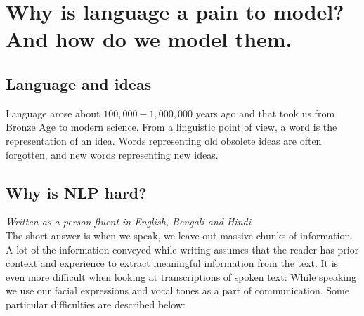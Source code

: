 
\chapter{Why is language a pain to model? And how do we model them.}
\section{Language and ideas}
Language arose about $100,000-1,000,000$ years ago and that took us from Bronze Age to modern science. From a linguistic point of view, a word is the representation of an idea. Words representing old obsolete ideas are often forgotten, and new words representing new ideas. 


\section{Why is NLP hard?}
\textit{Written as a person fluent in English, Bengali and Hindi}\\
The short answer is when we speak, we leave out massive chunks of information. A lot of the information  conveyed while writing assumes that the reader has prior context and experience to extract meaningful information from the text. It is even more difficult when looking at transcriptions of spoken text: While speaking we use our facial expressions and vocal tones as a part of communication.  Some particular difficulties are described below:
